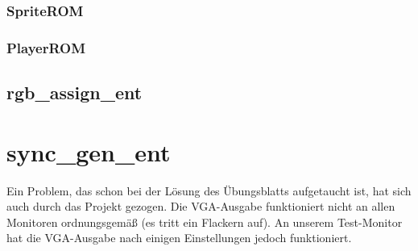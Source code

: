 \documentclass[parskip=full]{scrartcl}
\begin{document}
				\subsubsection{SpriteROM}

				\subsubsection{PlayerROM}

			\subsection{rgb\_assign\_ent}
		
		\section{sync\_gen\_ent}
			Ein Problem, das schon bei der Lösung des Übungsblatts aufgetaucht ist, hat sich auch durch das Projekt gezogen.
			Die VGA-Ausgabe funktioniert nicht an allen Monitoren ordnungsgemäß (es tritt ein Flackern auf). An unserem Test-Monitor hat die VGA-Ausgabe nach einigen Einstellungen jedoch funktioniert.
\end{document}
